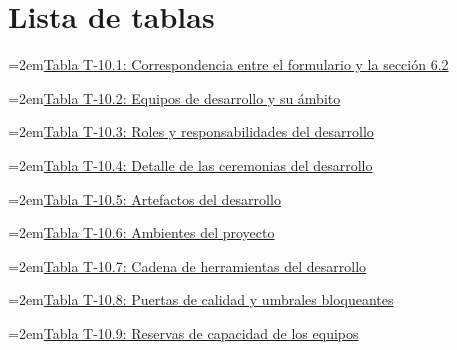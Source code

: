 \documentclass[11pt]{article}
\begin{document}

\tableofcontents
\clearpage
\section*{Lista de tablas}

\noindent\hangindent=2em\hyperref[tab:t10-indice]{Tabla T-10.1: Correspondencia entre el formulario y la sección 6.2}\dotfill\pageref{tab:t10-indice}\par\vspace{0.4\baselineskip}
\noindent\hangindent=2em\hyperref[tab:t10-equipos]{Tabla T-10.2: Equipos de desarrollo y su ámbito}\dotfill\pageref{tab:t10-equipos}\par\vspace{0.4\baselineskip}
\noindent\hangindent=2em\hyperref[tab:t10-roles]{Tabla T-10.3: Roles y responsabilidades del desarrollo}\dotfill\pageref{tab:t10-roles}\par\vspace{0.4\baselineskip}
\noindent\hangindent=2em\hyperref[tab:t10-ceremonias]{Tabla T-10.4: Detalle de las ceremonias del desarrollo}\dotfill\pageref{tab:t10-ceremonias}\par\vspace{0.4\baselineskip}
\noindent\hangindent=2em\hyperref[tab:t10-artefactos]{Tabla T-10.5: Artefactos del desarrollo}\dotfill\pageref{tab:t10-artefactos}\par\vspace{0.4\baselineskip}
\noindent\hangindent=2em\hyperref[tab:t10-ambientes]{Tabla T-10.6: Ambientes del proyecto}\dotfill\pageref{tab:t10-ambientes}\par\vspace{0.4\baselineskip}
\noindent\hangindent=2em\hyperref[tab:t10-herramientas]{Tabla T-10.7: Cadena de herramientas del desarrollo}\dotfill\pageref{tab:t10-herramientas}\par\vspace{0.4\baselineskip}
\noindent\hangindent=2em\hyperref[tab:t10-puertas]{Tabla T-10.8: Puertas de calidad y umbrales bloqueantes}\dotfill\pageref{tab:t10-puertas}\par\vspace{0.4\baselineskip}
\noindent\hangindent=2em\hyperref[tab:t10-reservas]{Tabla T-10.9: Reservas de capacidad de los equipos}\dotfill\pageref{tab:t10-reservas}\par\vspace{0.4\baselineskip}
\end{document}
